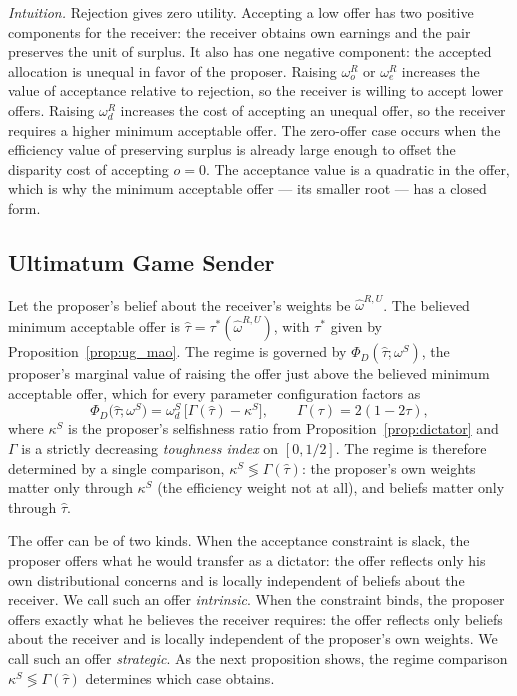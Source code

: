\documentclass[11pt]{article}
\theoremstyle{plain}
\theoremstyle{remark}
\begin{document}
\noindent\emph{Intuition.}  Rejection gives zero utility.  Accepting a low offer has two positive components for the receiver: the receiver obtains own earnings and the pair preserves the unit of surplus.  It also has one negative component: the accepted allocation is unequal in favor of the proposer.  Raising $\omega_o^R$ or $\omega_e^R$ increases the value of acceptance relative to rejection, so the receiver is willing to accept lower offers.  Raising $\omega_d^R$ increases the cost of accepting an unequal offer, so the receiver requires a higher minimum acceptable offer.  The zero-offer case occurs when the efficiency value of preserving surplus is already large enough to offset the disparity cost of accepting $o=0$.  The acceptance value is a quadratic in the offer, which is why the minimum acceptable offer --- its smaller root --- has a closed form.

\subsection{Ultimatum Game Sender}

Let the proposer's belief about the receiver's weights be $\hat\omega^{R,U}$.  The believed minimum acceptable offer is $\hat\tau=\tau^\ast(\hat\omega^{R,U})$, with $\tau^\ast$ given by Proposition~\ref{prop:ug_mao}.  The regime is governed by $\Phi_D(\hat\tau;\omega^S)$, the proposer's marginal value of raising the offer just above the believed minimum acceptable offer, which for every parameter configuration factors as
\begin{equation}
\label{eq:regime_factor}
        \Phi_D\big(\hat\tau;\omega^S\big)
        =
        \omega_d^S\,\big[\Gamma(\hat\tau)-\kappa^S\big],
        \qquad
        \Gamma(\tau)=2(1-2\tau),
\end{equation}
where $\kappa^S$ is the proposer's selfishness ratio from Proposition~\ref{prop:dictator} and $\Gamma$ is a strictly decreasing \emph{toughness index} on $[0,1/2]$.  The regime is therefore determined by a single comparison, $\kappa^S\lessgtr\Gamma(\hat\tau)$: the proposer's own weights matter only through $\kappa^S$ (the efficiency weight not at all), and beliefs matter only through $\hat\tau$.

The offer can be of two kinds.  When the acceptance constraint is slack, the proposer offers what he would transfer as a dictator: the offer reflects only his own distributional concerns and is locally independent of beliefs about the receiver.  We call such an offer \emph{intrinsic}.  When the constraint binds, the proposer offers exactly what he believes the receiver requires: the offer reflects only beliefs about the receiver and is locally independent of the proposer's own weights.  We call such an offer \emph{strategic}.  As the next proposition shows, the regime comparison $\kappa^S\lessgtr\Gamma(\hat\tau)$ determines which case obtains.
\end{document}
